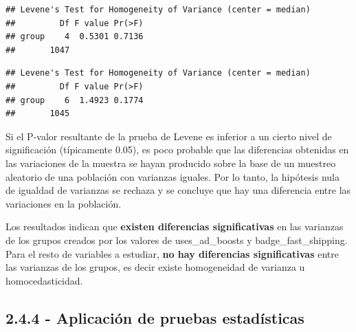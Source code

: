 \documentclass[
]{article}
\newenvironment{Shaded}{\begin{snugshade}}{\end{snugshade}}
\newcommand{\DataTypeTok}[1]{\textcolor[rgb]{0.13,0.29,0.53}{#1}}
\newcommand{\KeywordTok}[1]{\textcolor[rgb]{0.13,0.29,0.53}{\textbf{#1}}}
\newcommand{\NormalTok}[1]{#1}
\newcommand{\OperatorTok}[1]{\textcolor[rgb]{0.81,0.36,0.00}{\textbf{#1}}}
\newcommand{\StringTok}[1]{\textcolor[rgb]{0.31,0.60,0.02}{#1}}
\begin{document}
\begin{Shaded}
\end{Shaded}

\begin{verbatim}
## Levene's Test for Homogeneity of Variance (center = median)
##         Df F value Pr(>F)
## group    4  0.5301 0.7136
##       1047
\end{verbatim}

\begin{Shaded}
\end{Shaded}

\begin{verbatim}
## Levene's Test for Homogeneity of Variance (center = median)
##         Df F value Pr(>F)
## group    6  1.4923 0.1774
##       1045
\end{verbatim}

Si el P-valor resultante de la prueba de Levene es inferior a un cierto
nivel de significación (típicamente 0.05), es poco probable que las
diferencias obtenidas en las variaciones de la muestra se hayan
producido sobre la base de un muestreo aleatorio de una población con
varianzas iguales. Por lo tanto, la hipótesis nula de igualdad de
varianzas se rechaza y se concluye que hay una diferencia entre las
variaciones en la población.

Los resultados indican que \textbf{existen diferencias significativas}
en las varianzas de los grupos creados por los valores de
uses\_ad\_boosts y badge\_fast\_shipping. Para el resto de variables a
estudiar, \textbf{no hay diferencias significativas} entre las varianzas
de los grupos, es decir existe homogeneidad de varianza u
homocedasticidad.

\hypertarget{aplicaciuxf3n-de-pruebas-estaduxedsticas}{%
\subsection{2.4.4 - Aplicación de pruebas
estadísticas}\label{aplicaciuxf3n-de-pruebas-estaduxedsticas}}
\end{document}
